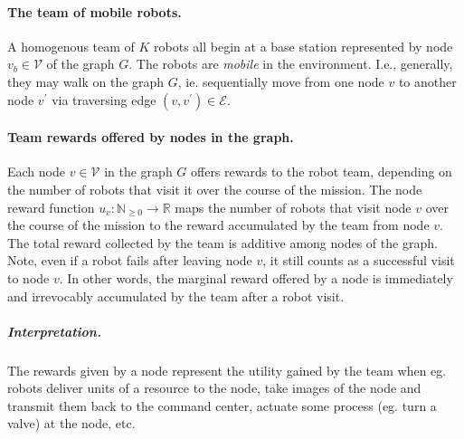 \documentclass[11pt, oneside]{article}
\begin{document}

\paragraph{The team of mobile robots.}
A homogenous team of $K$ robots all begin at a base station represented by node $v_b \in \mathcal{V}$ of the graph $G$. The robots are \emph{mobile} in the environment. I.e., generally, they may walk on the graph $G$, ie. sequentially move from one node $v$ to another node $v^\prime$ via traversing edge $(v, v^\prime)\in\mathcal{E}$.

\paragraph{Team rewards offered by nodes in the graph.}
Each node $v\in \mathcal{V}$ in the graph $G$ offers rewards to the robot team, depending on the number of robots that visit it over the course of the mission. 
The node reward function $u_v: \mathbb{N}_{\geq 0} \rightarrow \mathbb{R}$ maps 
the number of robots that visit node $v$ over the course of the mission
 to 
 the reward accumulated by the team from node $v$.
 The total reward collected by the team is additive among nodes of the graph.
Note, even if a robot fails after leaving node $v$, it still counts as a successful visit to node $v$.
In other words, the marginal reward offered by a node is immediately and irrevocably accumulated by the team after a robot visit.

\vspace{-\baselineskip}
\subparagraph{Interpretation.} The rewards given by a node represent the utility gained by the team when eg. robots deliver units of a resource to the node, take images of the node and transmit them back to the command center, actuate some process (eg. turn a valve) at the node, etc. 
\end{document}
